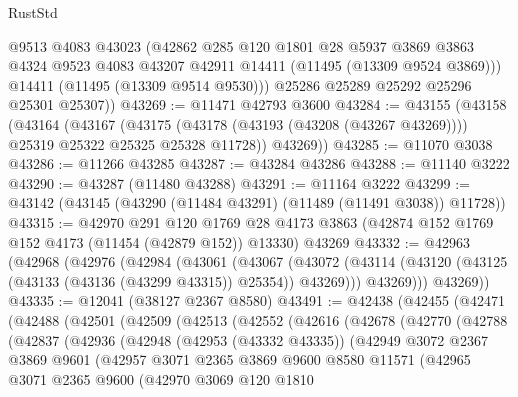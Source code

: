 \begin{lexlean}{RustStd}
\begin{coremodule}
          @9513
          @4083
          @43023
          (@42862
            @285
            @120
            @1801
            @28
            @5937
            @3869
            @3863
            @4324
            @9523
            @4083
            @43207
            @42911
            @14411
            (@11495 (@13309 @9524 @3869)))
          @14411
          (@11495 (@13309 @9514 @9530)))
        @25286
        @25289
        @25292
        @25296
        @25301
        @25307))
@43269 := @11471 @42793 @3600
@43284 := @43155
    (@43158
      (@43164
        (@43167
          (@43175 (@43178 (@43193 (@43208 (@43267 @43269)))) @25319 @25322 @25325 @25328 @11728))
        @43269))
@43285 := @11070 @3038
@43286 := @11266 @43285
@43287 := @43284 @43286
@43288 := @11140 @3222
@43290 := @43287 (@11480 @43288)
@43291 := @11164 @3222
@43299 := @43142 (@43145 (@43290 (@11484 @43291) (@11489 (@11491 @3038)) @11728))
@43315 := @42970
    @291
    @120
    @1769
    @28
    @4173
    @3863
    (@42874 @152 @1769 @152 @4173 (@11454 (@42879 @152)) @13330)
    @43269
@43332 := @42963
    (@42968
      (@42976
        (@42984
          (@43061
            (@43067
              (@43072 (@43114 (@43120 (@43125 (@43133 (@43136 (@43299 @43315)) @25354)) @43269)))
              @43269)))
        @43269))
@43335 := @12041 (@38127 @2367 @8580)
@43491 := @42438
    (@42455
      (@42471
        (@42488
          (@42501
            (@42509
              (@42513
                (@42552
                  (@42616
                    (@42678
                      (@42770
                        (@42788
                          (@42837
                            (@42936
                              (@42948
                                (@42953 (@43332 @43335))
                                (@42949
                                  @3072
                                  @2367
                                  @3869
                                  @9601
                                  (@42957
                                    @3071
                                    @2365
                                    @3869
                                    @9600
                                    @8580
                                    @11571
                                    (@42965
                                      @3071
                                      @2365
                                      @9600
                                      (@42970
                                        @3069
                                        @120
                                        @1810

\end{coremodule}
\end{lexlean}
